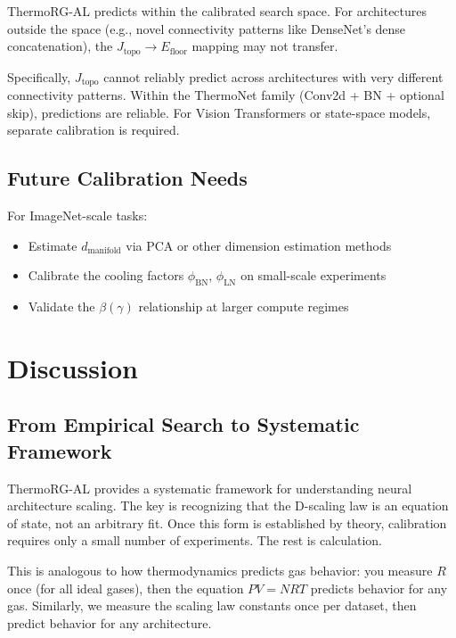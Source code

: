 \documentclass[11pt, a4paper]{article}
\theoremstyle{plain}
\begin{document}
ThermoRG-AL predicts within the calibrated search space. For architectures outside the space (e.g., novel connectivity patterns like DenseNet's dense concatenation), the $J_{\mathrm{topo}} \to E_{\mathrm{floor}}$ mapping may not transfer.

Specifically, $J_{\mathrm{topo}}$ cannot reliably predict across architectures with very different connectivity patterns. Within the ThermoNet family (Conv2d + BN + optional skip), predictions are reliable. For Vision Transformers or state-space models, separate calibration is required.

\subsection{Future Calibration Needs}

For ImageNet-scale tasks:
\begin{itemize}
\item Estimate $d_{\mathrm{manifold}}$ via PCA or other dimension estimation methods
\item Calibrate the cooling factors $\phi_{\mathrm{BN}}$, $\phi_{\mathrm{LN}}$ on small-scale experiments
\item Validate the $\beta(\gamma)$ relationship at larger compute regimes
\end{itemize}

\section{Discussion}

\subsection{From Empirical Search to Systematic Framework}

ThermoRG-AL provides a systematic framework for understanding neural architecture scaling. The key is recognizing that the D-scaling law is an equation of state, not an arbitrary fit. Once this form is established by theory, calibration requires only a small number of experiments. The rest is calculation.

This is analogous to how thermodynamics predicts gas behavior: you measure $R$ once (for all ideal gases), then the equation $PV = NRT$ predicts behavior for any gas. Similarly, we measure the scaling law constants once per dataset, then predict behavior for any architecture.
\end{document}
